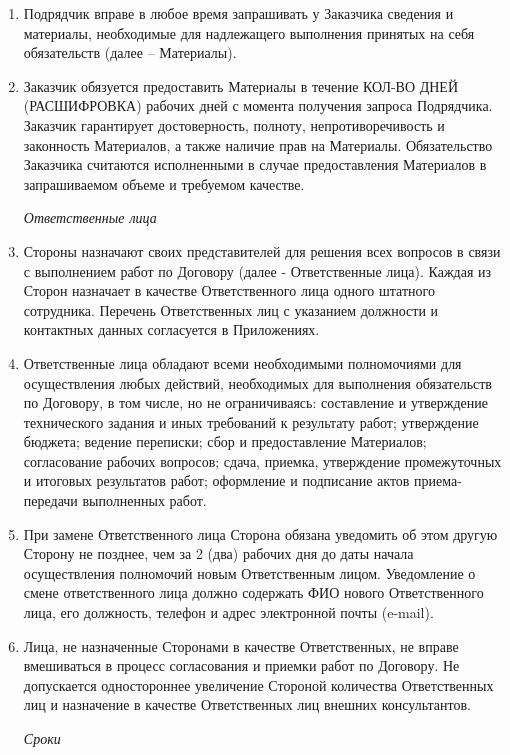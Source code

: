 \documentclass[14pt,a4paper]{article}
\begin{document}
\begin{enumerate}
\begin{enumerate}
		\item Подрядчик вправе в любое время запрашивать у Заказчика сведения и материалы, необходимые для надлежащего выполнения принятых на себя обязательств (далее – Материалы).
		
		\item Заказчик обязуется предоставить Материалы в течение КОЛ-ВО ДНЕЙ (РАСШИФРОВКА) рабочих дней с момента получения запроса Подрядчика. Заказчик гарантирует достоверность, полноту, непротиворечивость и законность Материалов, а также наличие прав на Материалы. Обязательство Заказчика считаются исполненными в случае предоставления Материалов в запрашиваемом объеме и требуемом качестве.

		\textit{Ответственные лица}

		\item Стороны назначают своих представителей для решения всех вопросов в связи с выполнением работ по Договору (далее - Ответственные лица). Каждая из Сторон назначает в качестве Ответственного лица одного штатного сотрудника. Перечень Ответственных лиц с указанием должности и контактных данных согласуется в Приложениях.

		\item Ответственные лица обладают всеми необходимыми полномочиями для осуществления любых действий, необходимых для выполнения обязательств по Договору, в том числе, но не ограничиваясь: составление и утверждение технического задания и иных требований к результату работ; утверждение бюджета; ведение переписки; сбор и предоставление Материалов; согласование рабочих вопросов; сдача, приемка, утверждение промежуточных и итоговых результатов работ; оформление и подписание актов приема-передачи выполненных работ.
		
		\item При замене Ответственного лица Сторона обязана уведомить об этом другую Сторону не позднее, чем за 2 (два) рабочих дня до даты начала осуществления полномочий новым Ответственным лицом. Уведомление о смене ответственного лица должно содержать ФИО нового Ответственного лица, его должность, телефон и адрес электронной почты (e-mail).
		
		\item Лица, не назначенные Сторонами в качестве Ответственных, не вправе вмешиваться в процесс согласования и приемки работ по Договору. Не допускается одностороннее увеличение Стороной количества Ответственных лиц и назначение в качестве Ответственных лиц внешних консультантов.

		\textit{Сроки}


\end{enumerate}
\end{enumerate}
\end{document}
